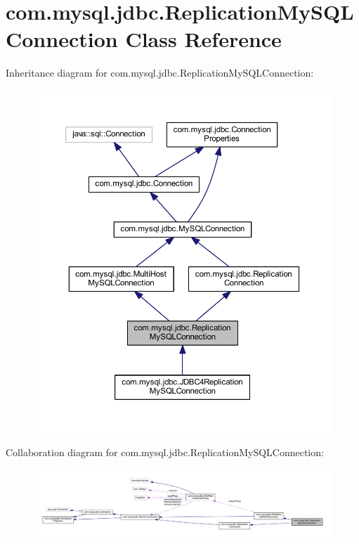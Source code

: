 \hypertarget{classcom_1_1mysql_1_1jdbc_1_1_replication_my_s_q_l_connection}{}\section{com.\+mysql.\+jdbc.\+Replication\+My\+S\+Q\+L\+Connection Class Reference}
\label{classcom_1_1mysql_1_1jdbc_1_1_replication_my_s_q_l_connection}


Inheritance diagram for com.\+mysql.\+jdbc.\+Replication\+My\+S\+Q\+L\+Connection\+:
\nopagebreak
\begin{figure}[H]
\begin{center}
\leavevmode
\includegraphics[width=350pt]{classcom_1_1mysql_1_1jdbc_1_1_replication_my_s_q_l_connection__inherit__graph}
\end{center}
\end{figure}


Collaboration diagram for com.\+mysql.\+jdbc.\+Replication\+My\+S\+Q\+L\+Connection\+:
\nopagebreak
\begin{figure}[H]
\begin{center}
\leavevmode
\includegraphics[width=350pt]{classcom_1_1mysql_1_1jdbc_1_1_replication_my_s_q_l_connection__coll__graph}
\end{center}
\end{figure}
